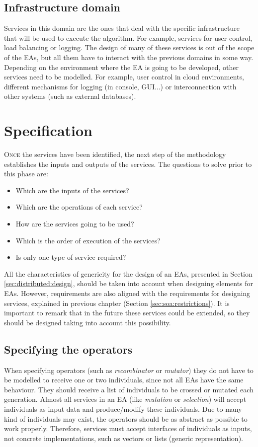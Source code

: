 \subsection{Infrastructure domain} Services in this domain are the ones that deal with the specific infrastructure that will be used to execute the algorithm. For example, services for user control, load balancing or logging. The design of many of these services is out of the scope of the EAs, but all them have to interact with the previous domains in some way. Depending on the environment where the EA is going to be developed, other services need to be modelled. For example, user control in cloud environments, different mechanisms for logging (in console, GUI...) or interconnection with other systems (such as external databases).

 

\section{Specification}

\lettrine{O}{nce} the services have been identified, the next step of the methodology establishes the inputs and outputs of the services. The questions to solve prior to this phase are:

\begin{itemize}
\item Which are the inputs of the services?
\item Which are the operations of each service?
\item How are the services going to be used?
\item Which is the order of execution of the services?
\item Is only one type of service required?
\end{itemize}

All the characteristics of genericity for the design of an EAs, presented in Section \ref{sec:distributed:design}, should be taken into account when designing elements for EAs. However, requirements are also aligned with the requirements for designing services, explained in previous chapter (Section \ref{sec:soa:restrictions}). It is important to remark that in the future these services could be extended, so they should be designed taking into account this possibility.



\subsection{Specifying the operators}
When specifying operators (such as 
{\em recombinator} or {\em mutator}) they do not have to be modelled to receive one or two
individuals, since not all EAs have the same behaviour. They should receive a
list of individuals to be crossed or mutated each generation. Almost all services in an EA (like {\em mutation} or {\em selection}) will accept individuals as input data and produce/modify these individuals. Due to many kind of individuals may exist, the operators should be as abstract as possible to work properly. Therefore, services must accept interfaces of individuals as inputs, not concrete implementations, such as vectors or lists (generic representation). 

